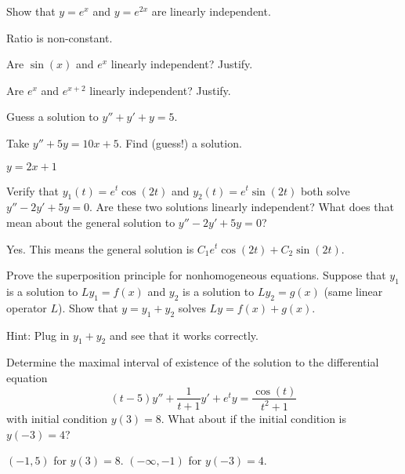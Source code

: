 \begin{exercise}
Show that $y=e^x$ and $y=e^{2x}$ are linearly independent.
\end{exercise}
\comboSol{%
}
{%
Ratio is non-constant.
}

\begin{exercise}\ansMark%
Are $\sin(x)$ and $e^x$ linearly independent?  Justify.
\end{exercise}


\begin{exercise}\ansMark%
Are $e^x$ and $e^{x+2}$ linearly independent?  Justify.
\end{exercise}

\begin{exercise}\ansMark%
Guess a solution to $y'' + y' + y= 5$.
\end{exercise}

\begin{exercise}
Take $y'' + 5 y = 10 x + 5$.  Find (guess!) a solution.
\end{exercise}
\comboSol{%
}
{%
$y = 2x+1$
}

\begin{exercise}
Verify that $y_1(t) = e^t \cos(2t)$ and $y_2(t) = e^t \sin(2t)$ both solve $y'' - 2y' + 5y = 0$. Are these two solutions linearly independent? What does that mean about the general solution to $y'' - 2y' + 5y = 0$?
\end{exercise}
\comboSol{%
}
{%
Yes. This means the general solution is $C_1e^{t}\cos(2t) + C_2\sin(2t)$.
}

\begin{exercise}
Prove the superposition principle for nonhomogeneous equations.  Suppose that
$y_1$ is a solution to $L y_1 = f(x)$ and $y_2$ is a solution to
$L y_2 = g(x)$ (same linear operator $L$).  Show that $y = y_1+y_2$ solves
$Ly = f(x) + g(x)$.
\end{exercise}
\comboSol{%
}
{%
Hint: Plug in $y_1 + y_2$ and see that it works correctly.
}

\begin{exercise}
Determine the maximal interval of existence of the solution to the differential equation
\[ (t - 5)y'' + \frac{1}{t+1}y' + e^t y = \frac{\cos(t)}{t^2 + 1} \] with initial condition $y(3) = 8$. What about if the initial condition is $y(-3) = 4$?
\end{exercise}
\comboSol{%
}
{%
$(-1, 5)$ for $y(3) = 8$. $(-\infty, -1)$ for $y(-3) = 4$.
}

